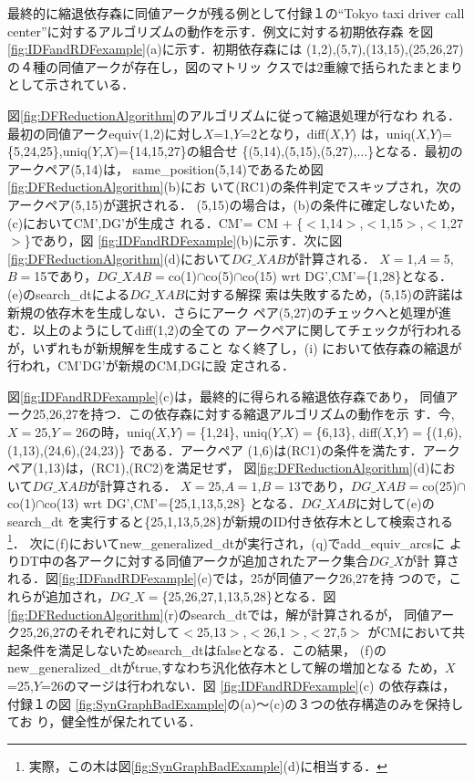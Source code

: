 最終的に縮退依存森に同値アークが残る例として付録１の``Tokyo taxi driver
call center''に対するアルゴリズムの動作を示す．例文に対する初期依存森
を図\ref{fig:IDFandRDFexample}(a)に示す．初期依存森には
(1,2),(5,7),(13,15),(25,26,27)の４種の同値アークが存在し，図のマトリッ
クスでは2重線で括られたまとまりとして示されている．

図\ref{fig:DFReductionAlgorithm}のアルゴリズムに従って縮退処理が行なわ
れる．最初の同値アークequiv(1,2)に対し$X$=1,$Y$=2となり，diff($X$,$Y$) 
は，uniq($X$,$Y$)=\{5,24,25\},uniq($Y$,$X$)=\{14,15,27\}の組合せ
\{(5,14),(5,15),(5,27),$\ldots$\}となる．最初のアークペア(5,14)は，
same\_position(5,14)であるため図\ref{fig:DFReductionAlgorithm}(b)にお
いて(RC1)の条件判定でスキップされ，次のアークペア(5,15)が選択される．
(5,15)の場合は，(b)の条件に確定しないため，(c)においてCM',DG'が生成さ
れる．CM'= CM + \{$<$1,14$>$,$<$1,15$>$,$<$1,27$>$\}であり，図
\ref{fig:IDFandRDFexample}(b)に示す．次に図
\ref{fig:DFReductionAlgorithm}(d)において$DG\_XAB$が計算される．
$X=$1,$A=$5,$B=$15であり，$DG\_XAB=$co(1)${\cap}$co(5)${\cap}$co(15)
wrt DG',CM'=\{1,28\}となる．(e)のsearch\_dtによる$DG\_XAB$に対する解探
索は失敗するため，(5,15)の許諾は新規の依存木を生成しない．さらにアーク
ペア(5,27)のチェックへと処理が進む．以上のようにしてdiff(1,2)の全ての
アークペアに関してチェックが行われるが，いずれもが新規解を生成すること
なく終了し，(i) において依存森の縮退が行われ，CM'DG'が新規のCM,DGに設
定される．

図\ref{fig:IDFandRDFexample}(c)は，最終的に得られる縮退依存森であり，
同値アーク25,26,27を持つ．この依存森に対する縮退アルゴリズムの動作を示
す．今,$X=$25,$Y=$26の時，uniq($X$,$Y$)$=$\{1,24\},
uniq($Y$,$X$)$=$\{6,13\},
diff($X$,$Y$)$=$\{(1,6),(1,13),(24,6),(24,23)\} である．アークペア
(1,6)は(RC1)の条件を満たす．アークペア(1,13)は，(RC1),(RC2)を満足せず，
図\ref{fig:DFReductionAlgorithm}(d)において$DG\_XAB$が計算される．
$X=25$,$A=1$,$B=13$であり，$DG\_XAB=$co(25)${\cap}$co(1)${\cap}$co(13)
wrt DG',CM'=\{25,1,13,5,28\} となる．$DG\_XAB$に対して(e)のsearch\_dt
を実行すると\{25,1,13,5,28\}が新規のID付き依存木として検索される
\footnote{実際，この木は図\ref{fig:SynGraphBadExample}(d)に相当する．}．
次に(f)においてnew\_generalized\_dtが実行され，(q)でadd\_equiv\_arcsに
よりDT中の各アークに対する同値アークが追加されたアーク集合$DG\_X$が計
算される．図\ref{fig:IDFandRDFexample}(c)では，25が同値アーク26,27を持
つので，これらが追加され，$DG\_X=$\{25,26,27,1,13,5,28\}となる．図
\ref{fig:DFReductionAlgorithm}(r)のsearch\_dtでは，解が計算されるが，
同値アーク25,26,27のそれぞれに対して$<$25,13$>$,$<$26,1$>$,$<$27,5$>$ 
がCMにおいて共起条件を満足しないためsearch\_dtはfalseとなる．この結果，
(f)のnew\_generalized\_dtがtrue,すなわち汎化依存木として解の増加となる
ため，$X$=25,$Y$=26のマージは行われない．図
\ref{fig:IDFandRDFexample}(c) の依存森は，付録１の図
\ref{fig:SynGraphBadExample}の(a)〜(c)の３つの依存構造のみを保持してお
り，健全性が保たれている．



